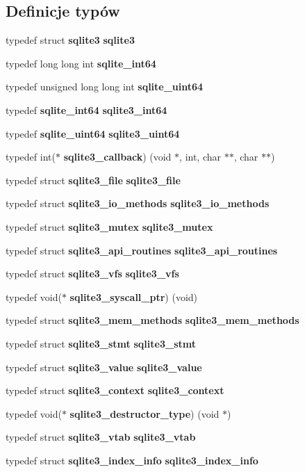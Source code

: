 \subsection*{Definicje typów}
\begin{DoxyCompactItemize}
\item 
typedef struct \textbf{ sqlite3} \textbf{ sqlite3}
\item 
typedef long long int \textbf{ sqlite\+\_\+int64}
\item 
typedef unsigned long long int \textbf{ sqlite\+\_\+uint64}
\item 
typedef \textbf{ sqlite\+\_\+int64} \textbf{ sqlite3\+\_\+int64}
\item 
typedef \textbf{ sqlite\+\_\+uint64} \textbf{ sqlite3\+\_\+uint64}
\item 
typedef int($\ast$ \textbf{ sqlite3\+\_\+callback}) (void $\ast$, int, char $\ast$$\ast$, char $\ast$$\ast$)
\item 
typedef struct \textbf{ sqlite3\+\_\+file} \textbf{ sqlite3\+\_\+file}
\item 
typedef struct \textbf{ sqlite3\+\_\+io\+\_\+methods} \textbf{ sqlite3\+\_\+io\+\_\+methods}
\item 
typedef struct \textbf{ sqlite3\+\_\+mutex} \textbf{ sqlite3\+\_\+mutex}
\item 
typedef struct \textbf{ sqlite3\+\_\+api\+\_\+routines} \textbf{ sqlite3\+\_\+api\+\_\+routines}
\item 
typedef struct \textbf{ sqlite3\+\_\+vfs} \textbf{ sqlite3\+\_\+vfs}
\item 
typedef void($\ast$ \textbf{ sqlite3\+\_\+syscall\+\_\+ptr}) (void)
\item 
typedef struct \textbf{ sqlite3\+\_\+mem\+\_\+methods} \textbf{ sqlite3\+\_\+mem\+\_\+methods}
\item 
typedef struct \textbf{ sqlite3\+\_\+stmt} \textbf{ sqlite3\+\_\+stmt}
\item 
typedef struct \textbf{ sqlite3\+\_\+value} \textbf{ sqlite3\+\_\+value}
\item 
typedef struct \textbf{ sqlite3\+\_\+context} \textbf{ sqlite3\+\_\+context}
\item 
typedef void($\ast$ \textbf{ sqlite3\+\_\+destructor\+\_\+type}) (void $\ast$)
\item 
typedef struct \textbf{ sqlite3\+\_\+vtab} \textbf{ sqlite3\+\_\+vtab}
\item 
typedef struct \textbf{ sqlite3\+\_\+index\+\_\+info} \textbf{ sqlite3\+\_\+index\+\_\+info}
\item 

\end{DoxyCompactItemize}
